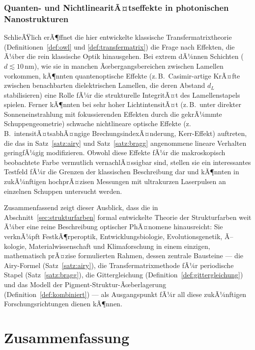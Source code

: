 ﻿\documentclass[a4paper,12pt]{article}
\theoremstyle{definition}
\begin{document}
	\subsubsection{Quanten- und NichtlinearitÃ¤tseffekte in photonischen Nanostrukturen}

	SchlieÃŸlich erÃ¶ffnet die hier entwickelte klassische
	Transfermatrixtheorie (Definitionen~\ref{def:owl} und
	\ref{def:transfermatrix}) die Frage nach Effekten, die Ã¼ber die
	rein klassische Optik hinausgehen. Bei extrem dÃ¼nnen Schichten
	($d \lesssim 10$\,nm), wie sie in manchen
	Ãœbergangsbereichen zwischen Lamellen vorkommen, kÃ¶nnten
	quantenoptische Effekte (z.\,B.\ Casimir-artige KrÃ¤fte zwischen
	benachbarten dielektrischen Lamellen, die deren Abstand $d_L$
	stabilisieren) eine Rolle fÃ¼r die strukturelle IntegritÃ¤t des
	Lamellenstapels spielen. Ferner kÃ¶nnten bei sehr hoher
	LichtintensitÃ¤t (z.\,B.\ unter direkter Sonneneinstrahlung mit
	fokussierenden Effekten durch die gekrÃ¼mmte Schuppengeometrie)
	schwache nichtlineare optische Effekte (z.\,B.\
	intensitÃ¤tsabhÃ¤ngige BrechungsindexÃ¤nderung, Kerr-Effekt)
	auftreten, die das in Satz~\ref{satz:airy} und
	Satz~\ref{satz:bragg} angenommene lineare Verhalten geringfÃ¼gig
	modifizieren. Obwohl diese Effekte fÃ¼r die makroskopisch
	beobachtete Farbe vermutlich vernachlÃ¤ssigbar sind, stellen sie ein
	interessantes Testfeld fÃ¼r die Grenzen der klassischen
	Beschreibung dar und kÃ¶nnten in zukÃ¼nftigen
	hochprÃ¤zisen Messungen mit ultrakurzen Laserpulsen an einzelnen
	Schuppen untersucht werden.

	Zusammenfassend zeigt dieser Ausblick, dass die in
	Abschnitt~\ref{sec:strukturfarben} formal entwickelte Theorie der
	Strukturfarben weit Ã¼ber eine reine Beschreibung optischer
	PhÃ¤nomene hinausreicht: Sie verknÃ¼pft FestkÃ¶rperoptik,
	Entwicklungsbiologie, Evolutionsgenetik, Ã–kologie, Materialwissenschaft
	und Klimaforschung in einem einzigen, mathematisch prÃ¤zise
	formulierten Rahmen, dessen zentrale Bausteine --- die Airy-Formel
	(Satz~\ref{satz:airy}), die Transfermatrixmethode fÃ¼r periodische
	Stapel (Satz~\ref{satz:bragg}), die Gittergleichung
	(Definition~\ref{def:gittergleichung}) und das Modell der
	Pigment-Struktur-Ãœberlagerung (Definition~\ref{def:kombiniert})
	--- als Ausgangspunkt fÃ¼r all diese zukÃ¼nftigen Forschungsrichtungen
	dienen kÃ¶nnen.


	\section{Zusammenfassung}
	
\end{document}
